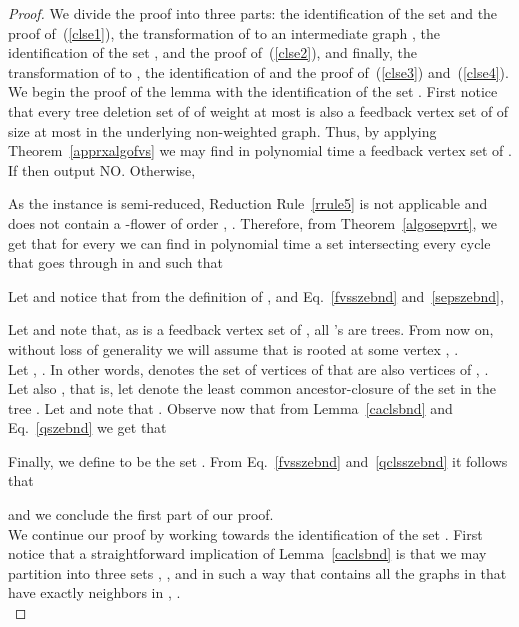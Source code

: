 \documentclass[a4paper,11pt]{article}
\begin{document}
\begin{proof} We divide the proof into three parts:  the identification of the set  and the proof of~(\ref{clse1}),  the transformation of  to an 
intermediate graph , the identification of the set , and the proof of~(\ref{clse2}), 
and finally,  the transformation of  to , the identification of  and the proof of~(\ref{clse3}) and~(\ref{clse4}).\\

We begin the proof of the lemma with the identification of the set . 
First notice that every tree deletion set of  of weight at most  is also a feedback vertex set of  of size at most  in the underlying non-weighted graph. Thus, by applying Theorem~\ref{apprxalgofvs} we may find 
in polynomial time a feedback vertex set  of . If  then output NO. Otherwise,
 
\noindent As the instance  is semi-reduced, Reduction Rule~\ref{rrule5} is not applicable and  does not contain a -flower of order , .
 Therefore, from Theorem~\ref{algosepvrt}, we get that for every  we can find in polynomial time a set  intersecting 
 every cycle that goes through  in  and such that 

Let  and notice that from the definition of , and Eq.~\eqref{fvsszebnd} and~\eqref{sepszebnd}, 

Let  and note that, as  is a feedback vertex set of , all 's are trees. 
 From now on, without loss of generality we will assume that  is rooted at some vertex , .\\

\noindent Let , . In other words,  denotes the set of vertices of  that are also vertices of , . 
Let also , that is, let  denote the least common ancestor-closure of the set  in the tree . 
Let  and note that . Observe now that from 
Lemma~\ref{caclsbnd} and Eq.~\eqref{qszebnd} we get that

Finally, we define  to be the set .
From Eq.~\eqref{fvsszebnd} and~\eqref{qclsszebnd} it follows that 

and we conclude the first part of our proof.\\

We continue our proof by working towards the identification of the set . 
First notice that a straightforward implication of Lemma~\ref{caclsbnd} is that we may partition 
into three sets , , and  in such a way that  
contains all the graphs in  that have exactly  neighbors in , .\\


\end{proof}
\end{document}

